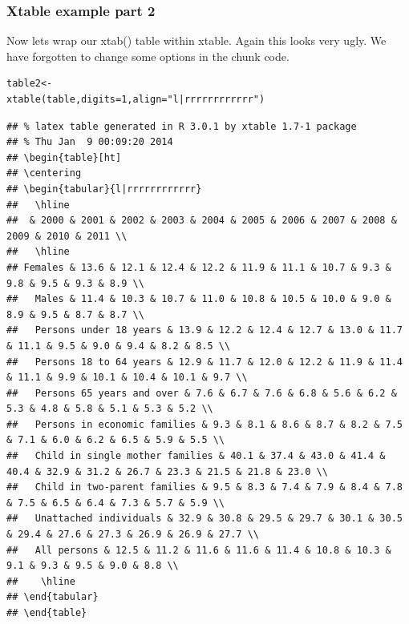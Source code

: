 \documentclass[nogin]{beamer}\usepackage[]{graphicx}\usepackage[]{color}
\makeatletter
\newenvironment{kframe}{%
 \def\at@end@of@kframe{}%
 \ifinner\ifhmode%
  \def\at@end@of@kframe{\end{minipage}}%
  \begin{minipage}{\columnwidth}%
 \fi\fi%
 \def\FrameCommand##1{\hskip\@totalleftmargin \hskip-\fboxsep
 \colorbox{shadecolor}{##1}\hskip-\fboxsep
     \hskip-\linewidth \hskip-\@totalleftmargin \hskip\columnwidth}%
 \MakeFramed {\advance\hsize-\width
   \@totalleftmargin\z@ \linewidth\hsize
   \@setminipage}}%
 {\par\unskip\endMakeFramed%
 \at@end@of@kframe}
\newenvironment{knitrout}{}{} %
\makeatother
\begin{document}
\begin{frame}[fragile]
\frametitle{Xtable example part 2}
\small
Now lets wrap our xtab() table within xtable. Again this looks very ugly. We have forgotten to change some options in the chunk code.
\begin{verbatim}
table2<-
xtable(table,digits=1,align="l|rrrrrrrrrrrr")
\end{verbatim}
\begin{knitrout}
\color{fgcolor}\begin{kframe}
\begin{verbatim}
## % latex table generated in R 3.0.1 by xtable 1.7-1 package
## % Thu Jan  9 00:09:20 2014
## \begin{table}[ht]
## \centering
## \begin{tabular}{l|rrrrrrrrrrrr}
##   \hline
##  & 2000 & 2001 & 2002 & 2003 & 2004 & 2005 & 2006 & 2007 & 2008 & 2009 & 2010 & 2011 \\ 
##   \hline
## Females & 13.6 & 12.1 & 12.4 & 12.2 & 11.9 & 11.1 & 10.7 & 9.3 & 9.8 & 9.5 & 9.3 & 8.9 \\ 
##   Males & 11.4 & 10.3 & 10.7 & 11.0 & 10.8 & 10.5 & 10.0 & 9.0 & 8.9 & 9.5 & 8.7 & 8.7 \\ 
##   Persons under 18 years & 13.9 & 12.2 & 12.4 & 12.7 & 13.0 & 11.7 & 11.1 & 9.5 & 9.0 & 9.4 & 8.2 & 8.5 \\ 
##   Persons 18 to 64 years & 12.9 & 11.7 & 12.0 & 12.2 & 11.9 & 11.4 & 11.1 & 9.9 & 10.1 & 10.4 & 10.1 & 9.7 \\ 
##   Persons 65 years and over & 7.6 & 6.7 & 7.6 & 6.8 & 5.6 & 6.2 & 5.3 & 4.8 & 5.8 & 5.1 & 5.3 & 5.2 \\ 
##   Persons in economic families & 9.3 & 8.1 & 8.6 & 8.7 & 8.2 & 7.5 & 7.1 & 6.0 & 6.2 & 6.5 & 5.9 & 5.5 \\ 
##   Child in single mother families & 40.1 & 37.4 & 43.0 & 41.4 & 40.4 & 32.9 & 31.2 & 26.7 & 23.3 & 21.5 & 21.8 & 23.0 \\ 
##   Child in two-parent families & 9.5 & 8.3 & 7.4 & 7.9 & 8.4 & 7.8 & 7.5 & 6.5 & 6.4 & 7.3 & 5.7 & 5.9 \\ 
##   Unattached individuals & 32.9 & 30.8 & 29.5 & 29.7 & 30.1 & 30.5 & 29.4 & 27.6 & 27.3 & 26.9 & 26.9 & 27.7 \\ 
##   All persons & 12.5 & 11.2 & 11.6 & 11.6 & 11.4 & 10.8 & 10.3 & 9.1 & 9.3 & 9.5 & 9.0 & 8.8 \\ 
##    \hline
## \end{tabular}
## \end{table}
\end{verbatim}
\end{kframe}
\end{knitrout}

\end{frame}
\end{document}
